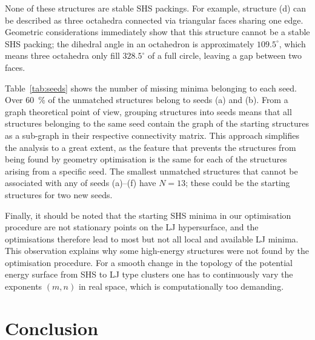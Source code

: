 %
None of these structures are stable \ac{SHS} packings. For example, structure
(d) can be described as three octahedra connected via triangular faces sharing
one edge. Geometric
considerations\autocite{Arkus_DerivingFiniteSphere_2011,Hoy_Structurefinitesphere_2012}
immediately show that this structure cannot be a stable \ac{SHS} packing; the
dihedral angle in an octahedron is approximately $109.5^\circ$, which means
three octahedra only fill $328.5^\circ$ of a full circle, leaving a gap between
two faces. 

Table~\ref{tab:seeds} shows the number of missing minima belonging to each seed.
Over 60~\% of the unmatched structures belong to seeds (a) and (b). From a graph
theoretical point of
view,\autocite{Arkus_Minimalenergyclusters_2009,Arkus_DerivingFiniteSphere_2011}
grouping structures into seeds means that all structures belonging to the same
seed contain the graph of the starting structures as a sub-graph in their
respective connectivity matrix. This approach simplifies the analysis to a great
extent, as the feature that prevents the structures from being found by geometry
optimisation is the same for each of the structures arising from a specific
seed. The smallest unmatched structures that cannot be associated with any of
seeds (a)--(f) have $N=13$; these could be the starting structures for two new
seeds.

Finally, it should be noted that the starting \ac{SHS} minima in our
optimisation procedure are not stationary points on the \ac{LJ} hypersurface,
and the optimisations therefore lead to most but not all local and available
\ac{LJ} minima. This observation explains why some high-energy structures were
not found by the optimisation procedure. For a smooth change in the topology of
the potential energy surface from \ac{SHS} to \ac{LJ} type clusters one has to
continuously vary the exponents $(m,n)$ in real space, which is computationally
too demanding.

\section{Conclusion}

